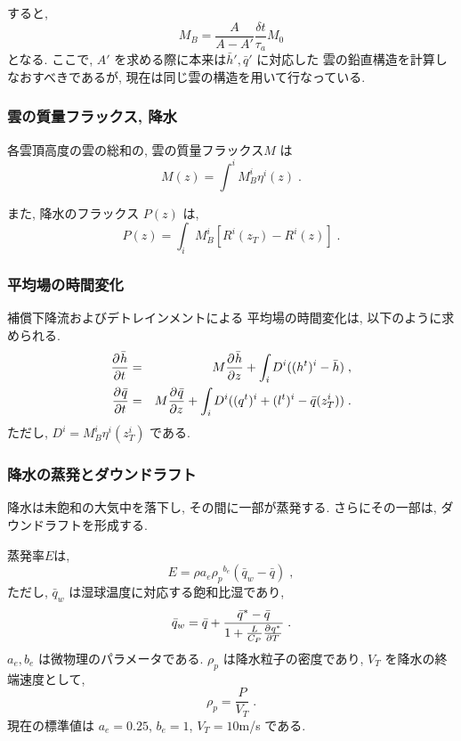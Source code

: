 すると,
\begin{equation}
  M_B = \frac{A}{A-A'} \frac{\delta t}{\tau_a} M_0 
\end{equation}
となる.
ここで, $A'$ を求める際に本来は$\bar{h}', \bar{q}'$ に対応した
雲の鉛直構造を計算しなおすべきであるが, 
現在は同じ雲の構造を用いて行なっている.

\subsubsection{雲の質量フラックス, 降水}

各雲頂高度の雲の総和の, 
雲の質量フラックス$M$ は
\begin{equation}
  M(z)   = \int^i M_B^i \eta^i(z) \; .
\end{equation}

また, 降水のフラックス $P(z)$ は,
\begin{equation}
 P(z) = \int_i M_B^i \left[ R^i(z_T)-R^i(z) \right]  \; .
\end{equation}

\subsubsection{平均場の時間変化}

補償下降流およびデトレインメントによる
平均場の時間変化は, 以下のように求められる.
\begin{eqnarray}
  \DP{\bar{h}}{t} & = & M \DP{\bar{h}}{z} 
                    + \int_i D^i ( (h^t)^i - \bar{h} ) \; , \\
  \DP{\bar{q}}{t} & = & M\DP{\bar{q}}{z} 
                    + \int_i D^i ( (q^t)^i + (l^t)^i - \bar{q}(z_T^i) ) \; .
\end{eqnarray}
ただし, $D^i = M_B^i \eta^i(z_T^i)$ である.

\subsubsection{降水の蒸発とダウンドラフト}

降水は未飽和の大気中を落下し, その間に一部が蒸発する.
さらにその一部は, ダウンドラフトを形成する.

蒸発率$E$は,
\begin{equation}
 E = \rho a_e {\rho_p}^{b_e} \left( \bar{q}_{w} - \bar{q} \right) \; ,
\end{equation}
ただし, $\bar{q}_{w}$ は湿球温度に対応する飽和比湿であり,
\begin{equation}
  \bar{q}_w = \bar{q} 
            + \frac{\bar{q}^* - \bar{q}}{1+ \frac{L}{C_P}\DP{q^*}{T}} \; .
\end{equation}
$a_e, b_e$ は微物理のパラメータである.
$\rho_p$ は降水粒子の密度であり, $V_T$ を降水の終端速度として,
\begin{equation}
  \rho_p = \frac{P}{V_T} \; .
\end{equation}
現在の標準値は $a_e=0.25$, $b_e=1$, $V_T=10$m/s である.

